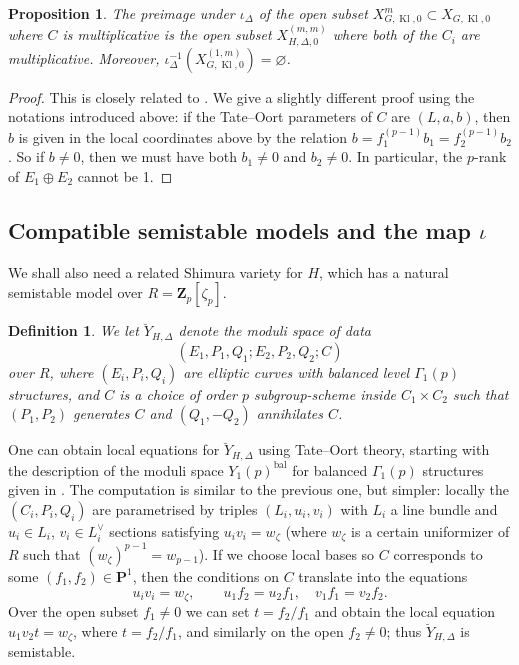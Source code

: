 \documentclass[cjm]{ipart}
\theoremstyle{plain}
\newtheorem{proposition}[theorem]{Proposition}
\newtheorem{definition}[theorem]{Definition}
\theoremstyle{remark}
\DeclareMathOperator{\Kl}{Kl}
\newcommand{\Zp}{\mathbf{Z}_p}
\numberwithin{equation}{subsection}
\begin{document}
  \begin{proposition}\label{prop:preimagemult}
   The preimage under $\iota_{\Delta}$ of the open subset $X_{G, \Kl, 0}^m \subset X_{G, \Kl, 0}$ where $C$ is multiplicative is the open subset $X_{H, \Delta, 0}^{(m, m)}$ where both of the $C_i$ are multiplicative. Moreover, $\iota_{\Delta}^{-1}\left(X_{G, \Kl, 0}^{(1, m)} \right) = \varnothing$.
  \end{proposition}

  \begin{proof}
   This is closely related to \cite[Prop. 4.6]{LPSZ1}. We give a slightly different proof using the notations introduced above: if the Tate--Oort parameters of $C$ are $(L, a, b)$, then $b$ is given in the local coordinates above by the relation $b = f_1^{(p-1)} b_1 = f_2^{(p-1)} b_2$. So if $b \ne 0$, then we must have both $b_1 \ne 0$ and $b_2 \ne 0$. In particular, the $p$-rank of $E_1 \oplus E_2$ cannot be 1.
  \end{proof}

 \subsection{Compatible semistable models and the map \texorpdfstring{$\iota$}{iota}}\label{ss:iotaproperties}

  We shall also need a related Shimura variety for $H$, which has a natural semistable model over $R = \Zp[\zeta_p]$.

  \begin{definition}
   We let $\breve{Y}_{H, \Delta}$ denote the moduli space of data
   \[ (E_1, P_1, Q_1; E_2, P_2, Q_2; C)\]
   over $R$, where $(E_i, P_i, Q_i)$ are elliptic curves with balanced level $\Gamma_1(p)$ structures, and $C$ is a choice of order $p$ subgroup-scheme inside $C_1 \times C_2$ such that $(P_1, P_2)$ generates $C$ and $(Q_1, -Q_2)$ annihilates $C$.
  \end{definition}

  One can obtain local equations for $\breve{Y}_{H, \Delta}$ using Tate--Oort theory, starting with the description of the moduli space $Y_1(p)^{\mathrm{bal}}$ for balanced $\Gamma_1(p)$ structures given in \cite{delignerapoport73}. The computation is similar to the previous one, but simpler: locally the $(C_i, P_i, Q_i)$ are parametrised by triples $(L_i, u_i, v_i)$ with $L_i$ a line bundle and $u_i \in L_i$, $v_i \in L_i^\vee$ sections satisfying $u_i v_i = w_\zeta$ (where $w_\zeta$ is a certain uniformizer of $R$ such that $(w_\zeta)^{p-1} = w_{p-1}$). If we choose local bases so $C$ corresponds to some $(f_1, f_2) \in \mathbf{P}^1$, then the conditions on $C$ translate into the equations
  \[ u_i v_i = w_{\zeta}, \qquad  u_1 f_2 = u_2 f_1, \quad v_1 f_1 = v_2 f_2. \]
  Over the open subset $f_1 \ne 0$ we can set $t = f_2 / f_1$ and obtain the local equation $u_1 v_2 t = w_{\zeta}$, where $t = f_2 / f_1$, and similarly on the open $f_2 \ne 0$; thus $\breve{Y}_{H, \Delta}$ is semistable.
\end{document}
